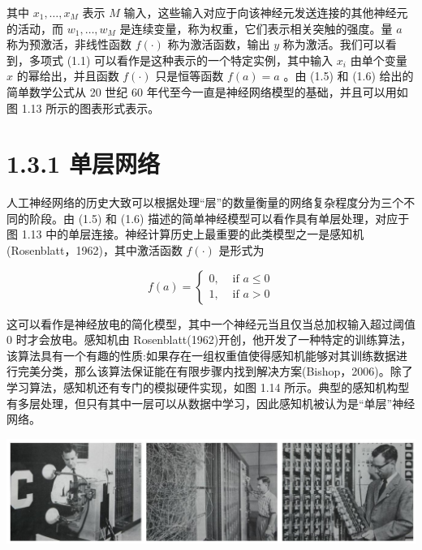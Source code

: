 \documentclass[10pt]{article}
\begin{document}
其中 \({x}_{1},\ldots ,{x}_{M}\) 表示 \(M\) 输入，这些输入对应于向该神经元发送连接的其他神经元的活动，而 \({w}_{1},\ldots ,{w}_{M}\) 是连续变量，称为权重，它们表示相关突触的强度。量 \(a\) 称为预激活，非线性函数 \(f\left( \cdot \right)\) 称为激活函数，输出 \(y\) 称为激活。我们可以看到，多项式 (1.1) 可以看作是这种表示的一个特定实例，其中输入 \({x}_{i}\) 由单个变量 \(x\) 的幂给出，并且函数 \(f\left( \cdot \right)\) 只是恒等函数 \(f\left( a\right)  = a\) 。由 (1.5) 和 (1.6) 给出的简单数学公式从 20 世纪 60 年代至今一直是神经网络模型的基础，并且可以用如图 1.13 所示的图表形式表示。

\section*{1.3.1 单层网络}

人工神经网络的历史大致可以根据处理“层”的数量衡量的网络复杂程度分为三个不同的阶段。由 (1.5) 和 (1.6) 描述的简单神经模型可以看作具有单层处理，对应于图 1.13 中的单层连接。神经计算历史上最重要的此类模型之一是感知机(Rosenblatt，1962)，其中激活函数 \(f\left( \cdot \right)\) 是形式为

\[
f\left( a\right)  = \left\{  \begin{array}{ll} 0, & \text{ if }a \leq  0 \\  1, & \text{ if }a > 0 \end{array}\right.  \tag{1.7}
\]

这可以看作是神经放电的简化模型，其中一个神经元当且仅当总加权输入超过阈值 0 时才会放电。感知机由 Rosenblatt(1962)开创，他开发了一种特定的训练算法，该算法具有一个有趣的性质:如果存在一组权重值使得感知机能够对其训练数据进行完美分类，那么该算法保证能在有限步骤内找到解决方案(Bishop，2006)。除了学习算法，感知机还有专门的模拟硬件实现，如图 1.14 所示。典型的感知机构型有多层处理，但只有其中一层可以从数据中学习，因此感知机被认为是“单层”神经网络。

\begin{center}
\includegraphics[max width=1.0\textwidth]{images/0194e279-9b28-703a-88f4-c3ac21e2010d_37_207_344_1342_344_0.jpg}
\end{center}
\hspace*{3em} 
\end{document}
